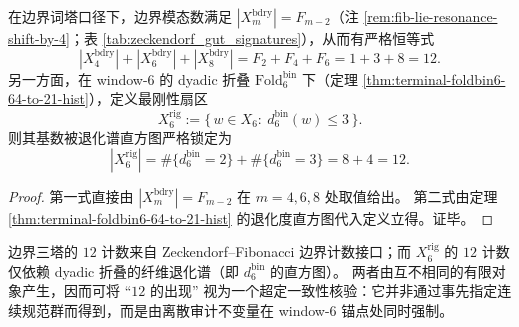 
\begin{corollary}\label{cor:window6-double-lock-12}
在边界词塔口径下，边界模态数满足 \(|X_m^{\mathrm{bdry}}|=F_{m-2}\)（注 \ref{rem:fib-lie-resonance-shift-by-4}；表 \ref{tab:zeckendorf_gut_signatures}），从而有严格恒等式
\[
|X_4^{\mathrm{bdry}}|+|X_6^{\mathrm{bdry}}|+|X_8^{\mathrm{bdry}}|
=F_2+F_4+F_6
=1+3+8
=12.
\]
另一方面，在 window-\(6\) 的 dyadic 折叠 \(\mathrm{Fold}^{\mathrm{bin}}_6\) 下（定理 \ref{thm:terminal-foldbin6-64-to-21-hist}），定义最刚性扇区
\[
X_6^{\mathrm{rig}}
:=\{\,w\in X_6:\ d^{\mathrm{bin}}_6(w)\le 3\,\}.
\]
则其基数被退化谱直方图严格锁定为
\[
|X_6^{\mathrm{rig}}|
=\#\{d^{\mathrm{bin}}_6=2\}+\#\{d^{\mathrm{bin}}_6=3\}
=8+4
=12.
\]
\end{corollary}
\begin{proof}
第一式直接由 \(|X_m^{\mathrm{bdry}}|=F_{m-2}\) 在 \(m=4,6,8\) 处取值给出。
第二式由定理 \ref{thm:terminal-foldbin6-64-to-21-hist} 的退化度直方图代入定义立得。证毕。
\end{proof}

\begin{remark}[两条锁定机制的独立性与超定一致性]\label{rem:window6-double-lock-12-independent}
边界三塔的 \(12\) 计数来自 Zeckendorf--Fibonacci 边界计数接口；而 \(X_6^{\mathrm{rig}}\) 的 \(12\) 计数仅依赖 dyadic 折叠的纤维退化谱（即 \(d^{\mathrm{bin}}_6\) 的直方图）。
两者由互不相同的有限对象产生，因而可将 “\(12\) 的出现” 视为一个超定一致性核验：它并非通过事先指定连续规范群而得到，而是由离散审计不变量在 window-\(6\) 锚点处同时强制。
\end{remark}

\endinput
